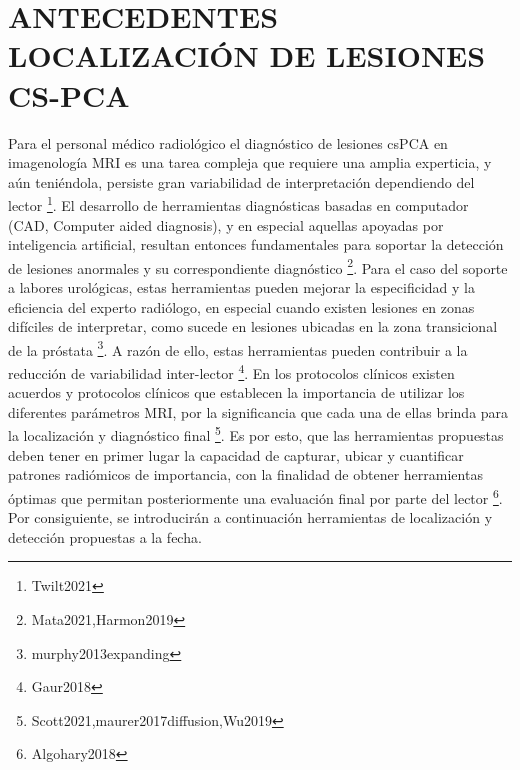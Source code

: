 \section{ANTECEDENTES LOCALIZACIÓN DE LESIONES CS-PCA}\label{sec:localiza_pca}Para el personal médico radiológico el diagnóstico de lesiones csPCA en imagenología MRI es una tarea compleja que requiere una amplia experticia, y aún teniéndola, persiste gran variabilidad de interpretación dependiendo del lector \footnote{Twilt2021}. El desarrollo de herramientas diagnósticas basadas en computador (CAD, Computer aided diagnosis), y en especial aquellas apoyadas por inteligencia artificial, resultan entonces fundamentales para soportar la detección de lesiones anormales y su correspondiente diagnóstico \footnote{Mata2021,Harmon2019}. Para el caso del soporte a labores urológicas, estas herramientas pueden mejorar la especificidad y la eficiencia del experto radiólogo, en especial cuando existen lesiones en zonas difíciles de interpretar, como sucede en lesiones ubicadas en la zona transicional de la próstata \footnote{murphy2013expanding}. A razón de ello, estas herramientas pueden contribuir a la reducción de variabilidad inter-lector \footnote{Gaur2018}. En los protocolos clínicos existen acuerdos y protocolos clínicos que establecen la importancia de utilizar los diferentes parámetros MRI, por la significancia que cada una de ellas brinda para la localización y diagnóstico final \footnote{Scott2021,maurer2017diffusion,Wu2019}. Es por esto, que las herramientas propuestas deben tener en primer lugar la capacidad de capturar, ubicar y cuantificar patrones radiómicos de importancia, con la finalidad de obtener herramientas óptimas que permitan posteriormente una evaluación final por parte del lector \footnote{Algohary2018}. Por consiguiente, se introducirán a continuación herramientas de localización y detección propuestas a la fecha.\par

